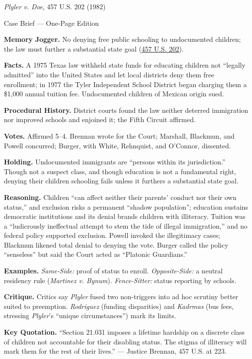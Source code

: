 \documentclass[12pt]{article}
\begin{document}
\begin{center}
{\Large \textit{Plyler v. Doe}, 457 U.S. 202 (1982)\par}
\vspace{0.3em}
{\normalsize Case Brief --- One-Page Edition\par}
\end{center}

\textbf{Memory Jogger.} No denying free public schooling to undocumented children; the law must further a substantial state goal (\href{https://supreme.justia.com/cases/federal/us/457/202/}{457 U.S. 202}).

\textbf{Facts.} A 1975 Texas law withheld state funds for educating children not ``legally admitted'' into the United States and let local districts deny them free enrollment; in 1977 the Tyler Independent School District began charging them a \$1,000 annual tuition fee. Undocumented children of Mexican origin sued.

\textbf{Procedural History.} District courts found the law neither deterred immigration nor improved schools and enjoined it; the Fifth Circuit affirmed.

\textbf{Votes.} Affirmed 5--4. Brennan wrote for the Court; Marshall, Blackmun, and Powell concurred; Burger, with White, Rehnquist, and O'Connor, dissented.

\textbf{Holding.} Undocumented immigrants are ``persons within its jurisdiction.'' Though not a suspect class, and though education is not a fundamental right, denying their children schooling fails unless it furthers a substantial state goal.

\textbf{Reasoning.} Children ``can affect neither their parents' conduct nor their own status,'' and exclusion risks a permanent ``shadow population''; education sustains democratic institutions and its denial brands children with illiteracy. Tuition was a ``ludicrously ineffectual attempt to stem the tide of illegal immigration,'' and no federal policy supported exclusion. Powell invoked the illegitimacy cases; Blackmun likened total denial to denying the vote. Burger called the policy ``senseless'' but said the Court acted as ``Platonic Guardians.''

\textbf{Examples.} \emph{Same-Side:} proof of status to enroll. \emph{Opposite-Side:} a neutral residency rule (\textit{Martinez v. Bynum}). \emph{Fence-Sitter:} status reporting by schools.

\textbf{Critique.} Critics say \textit{Plyler} fused two non-triggers into ad hoc scrutiny better suited to preemption. \textit{Rodriguez} (funding disparities) and \textit{Kadrmas} (bus fees, stressing \textit{Plyler}'s ``unique circumstances'') mark its limits.

\textbf{Key Quotation.} ``Section 21.031 imposes a lifetime hardship on a discrete class of children not accountable for their disabling status. The stigma of illiteracy will mark them for the rest of their lives.'' --- Justice Brennan, 457 U.S. at 223.
\end{document}
